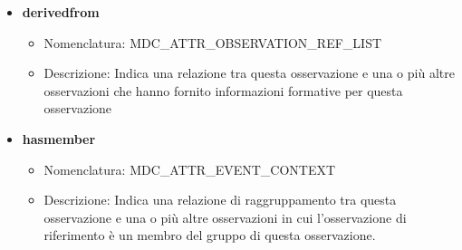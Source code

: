 \documentclass[a4paper]{article}
\begin{document}
\begin{itemize}
    \item \textbf{derivedfrom}
        \begin{itemize}
            \item Nomenclatura: MDC\_ATTR\_OBSERVATION\_REF\_LIST
            \item Descrizione: Indica una relazione tra questa osservazione e una o più altre osservazioni che hanno fornito informazioni formative per questa osservazione 
        \end{itemize}
    \item \textbf{hasmember}
        \begin{itemize}
            \item Nomenclatura: MDC\_ATTR\_EVENT\_CONTEXT
            \item Descrizione: Indica una relazione di raggruppamento tra questa osservazione e una o più altre osservazioni in cui l'osservazione di riferimento è un membro del gruppo di questa osservazione.
            

\end{itemize}
\end{itemize}
\end{document}
